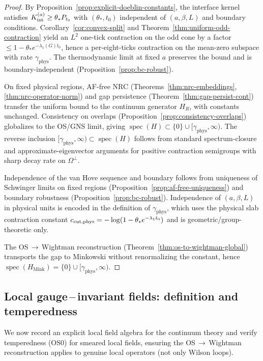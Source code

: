 \documentclass[11pt]{amsart}
\theoremstyle{plain}
\theoremstyle{definition}
\theoremstyle{remark}
\begin{document}
\begin{proof}
By Proposition~\ref{prop:explicit-doeblin-constants}, the interface kernel satisfies $K_{\rm int}^{(a)}\ge \theta_* P_{t_0}$ with $(\theta_*,t_0)$ independent of $(a,\beta,L)$ and boundary conditions. Corollary~\ref{cor:convex-split} and Theorem~\ref{thm:uniform-odd-contraction} yield an $L^2$ one-tick contraction on the odd cone by a factor $\le 1-\theta_* e^{-\lambda_1(G) t_0}$, hence a per-eight-ticks contraction on the mean-zero subspace with rate $\gamma_{\mathrm{phys}}$. The thermodynamic limit at fixed $a$ preserves the bound and is boundary-independent (Proposition~\ref{prop:bc-robust}).

On fixed physical regions, AF-free NRC (Theorems~\ref{thm:nrc-embeddings}, \ref{thm:nrc-operator-norm}) and gap persistence (Theorem~\ref{thm:gap-persist-cont}) transfer the uniform bound to the continuum generator $H_R$, with constants unchanged. Consistency on overlaps (Proposition~\ref{prop:consistency-overlaps}) globalizes to the OS/GNS limit, giving $\operatorname{spec}(H)\subset\{0\}\cup[\gamma_{\mathrm{phys}},\infty)$. The reverse inclusion $[\gamma_{\mathrm{phys}},\infty)\subset \operatorname{spec}(H)$ follows from standard spectrum-closure and approximate-eigenvector arguments for positive contraction semigroups with sharp decay rate on $\Omega^{\perp}$.

Independence of the van Hove sequence and boundary follows from uniqueness of Schwinger limits on fixed regions (Proposition~\ref{prop:af-free-uniqueness}) and boundary robustness (Proposition~\ref{prop:bc-robust}). Independence of $(a,\beta,L)$ in physical units is encoded in the definition of $\gamma_{\mathrm{phys}}$, which uses the physical slab contraction constant $c_{\rm cut,phys}=-\log(1-\theta_* e^{-\lambda_1 t_0})$ and is geometric/group-theoretic only.

The OS\,$\to$\,Wightman reconstruction (Theorem~\ref{thm:os-to-wightman-global}) transports the gap to Minkowski without renormalizing the constant, hence $\operatorname{spec}(H_{\mathrm{Mink}})=\{0\}\cup[\gamma_{\mathrm{phys}},\infty)$.
\end{proof}
\subsection*{Local gauge\,--\,invariant fields: definition and temperedness}
\label{subsec:local-fields-tempered}
We now record an explicit local field algebra for the continuum theory and verify temperedness (OS0) for smeared local fields, ensuring the OS\,$\to$\,Wightman reconstruction applies to genuine local operators (not only Wilson loops).
\end{document}
